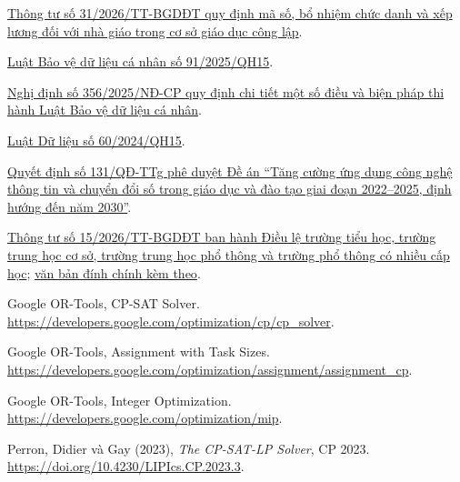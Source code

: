 \documentclass[12pt,a4paper]{report}
\begin{document}
\begin{enumerate}[label={[\arabic*]},leftmargin=1.1cm,itemsep=0.6em]
\item\label{ref:source-16} \href{https://vanban.chinhphu.vn/?docid=217840\&pageid=27160}{Thông tư số 31/2026/TT-BGDĐT quy định mã số, bổ nhiệm chức danh và xếp lương đối với nhà giáo trong cơ sở giáo dục công lập}.

\item\label{ref:source-17} \href{https://vanban.chinhphu.vn/?docid=214590\&pageid=27160}{Luật Bảo vệ dữ liệu cá nhân số 91/2025/QH15}.

\item\label{ref:source-18} \href{https://vanban.chinhphu.vn/?docid=216387\&pageid=27160}{Nghị định số 356/2025/NĐ-CP quy định chi tiết một số điều và biện pháp thi hành Luật Bảo vệ dữ liệu cá nhân}.

\item\label{ref:source-19} \href{https://vanban.chinhphu.vn/?docid=212488\&pageid=27160}{Luật Dữ liệu số 60/2024/QH15}.

\item\label{ref:source-20} \href{https://congbao.chinhphu.vn/van-ban/quyet-dinh-so-131-qd-ttg-36755.htm}{Quyết định số 131/QĐ-TTg phê duyệt Đề án ``Tăng cường ứng dụng công nghệ thông tin và chuyển đổi số trong giáo dục và đào tạo giai đoạn 2022--2025, định hướng đến năm 2030''}.

\item\label{ref:source-21} \href{https://vanban.chinhphu.vn/?docid=217678\&pageid=27160}{Thông tư số 15/2026/TT-BGDĐT ban hành Điều lệ trường tiểu học, trường trung học cơ sở, trường trung học phổ thông và trường phổ thông có nhiều cấp học}; \href{https://datafiles.chinhphu.vn/cpp/files/vbpq/2026/5/dinh-chinh-tt-15-bgddt.pdf}{văn bản đính chính kèm theo}.

\item\label{ref:source-22} Google OR-Tools, CP-SAT Solver. \url{https://developers.google.com/optimization/cp/cp_solver}.

\item\label{ref:source-23} Google OR-Tools, Assignment with Task Sizes. \url{https://developers.google.com/optimization/assignment/assignment_cp}.

\item\label{ref:source-24} Google OR-Tools, Integer Optimization. \url{https://developers.google.com/optimization/mip}.

\item\label{ref:source-25} Perron, Didier và Gay (2023), \textit{The CP-SAT-LP Solver}, CP 2023. \url{https://doi.org/10.4230/LIPIcs.CP.2023.3}.


\end{enumerate}
\end{document}

